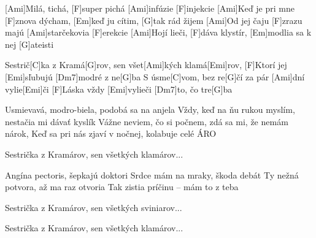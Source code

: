 
[Ami]Milá, tichá, [F]super pichá [Ami]infúzie [F]injekcie
[Ami]Keď je pri mne [F]znova dýcham, [Em]keď ju cítim, [G]tak rád žijem
[Ami]Od jej čaju [F]zrazu majú [Ami]starčekovia [F]erekcie
[Ami]Hojí lieči, [F]dáva klystír, [Em]modlia sa k nej [G]ateisti

Sestrič[C]ka z Kramá[G]rov, sen všet[Ami]kých klamá[Emi]rov,
[F]Ktorí jej [Emi]sľubujú [Dm7]modré z ne[G]ba
S úsme[C]vom, bez re[G]\null čí za pár [Ami]dní vylie[Emi]\null či
[F]Láska vždy [Emi]vylieči [Dm7]to, čo tre[G]ba

Usmievavá, modro-biela, podobá sa na anjela
Vždy, keď na ňu rukou myslím, nestačia mi dávať kyslík
Vážne neviem, čo si počnem, zdá sa mi, že nemám nárok,
Keď sa pri nás zjaví v nočnej, kolabuje celé ÁRO

Sestrička z Kramárov, sen všetkých klamárov...

Angína pectoris, šepkajú doktori
Srdce mám na mraky, škoda debát
Ty nežná potvora, až ma raz otvoria
Tak zistia príčinu – mám to z teba

Sestrička z Kramárov, sen všetkých sviniarov...

Sestrička z Kramárov, sen všetkých klamárov...



